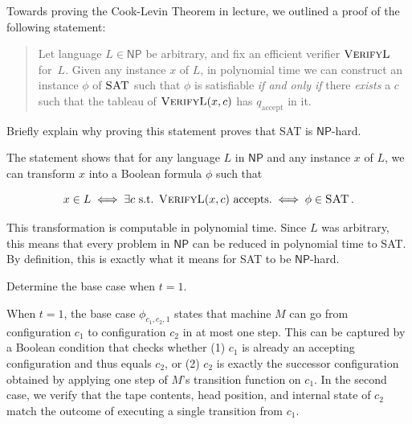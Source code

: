 \documentclass[12pt, letterpaper]{article}
\newcommand{\NP}{\mathsf{NP}}
\renewcommand{\t}[1]{\text{#1}}
\begin{document}
\begin{subproblem}{}
    Towards proving the Cook-Levin Theorem in lecture, we outlined a proof of the following statement: 
    \begin{quote}
      Let language $L \in \NP$ be arbitrary, and fix an efficient verifier $\textsc{VerifyL}$ for~$L$.
      Given any instance $x$ of $L$, in polynomial time we can construct an instance $\phi$ of $\textsc{SAT}$ such that $\phi$ is satisfiable \emph{if and only if} there \emph{exists} a $c$ such that the tableau of $\textsc{VerifyL}(x,c)$ has $q_\text{accept}$ in it.
    \end{quote}
    Briefly explain why proving this statement proves that SAT is $\NP$-hard.
\end{subproblem}
\begin{problemproof}
    The statement shows that for any language \(L\) in \(\NP\) and any instance \(x\) of \(L\), we can transform \(x\) into a Boolean formula \(\phi\) such that

\[
x \in L \iff \exists\t{$c$ s.t. \textsc{VerifyL}}(x,c) \t{ accepts.} \iff \phi \in \SAT\,.
\]

This transformation is computable in polynomial time. Since \(L\) was arbitrary, this means that every problem in \(\NP\) can be reduced in polynomial time to SAT. By definition, this is exactly what it means for SAT to be \(\NP\)-hard.
\end{problemproof}

\newcommand{\PSPACE}{\mathsf{PSPACE}}
\newcommand{\EXPTIME}{\mathsf{EXPTIME}}
\newcommand{\TQBF}{\textsc{TQBF}}

\qh[$\PSPACE$ and $\TQBF$]
\begin{subproblem}{}
    Determine the base case when $t = 1$.
\end{subproblem}
\begin{problemproof}
    When \(t=1\), the base case \(\phi_{c_1,c_2,1}\) states that machine \(M\) can go from configuration \(c_1\) to configuration \(c_2\) in at most one step. This can be captured by a Boolean condition that checks whether (1) \(c_1\) is already an accepting configuration and thus equals \(c_2\), or (2) \(c_2\) is exactly the successor configuration obtained by applying one step of \(M\)'s transition function on \(c_1\). In the second case, we verify that the tape contents, head position, and internal state of \(c_2\) match the outcome of executing a single transition from \(c_1\).
\end{problemproof}
\end{document}
